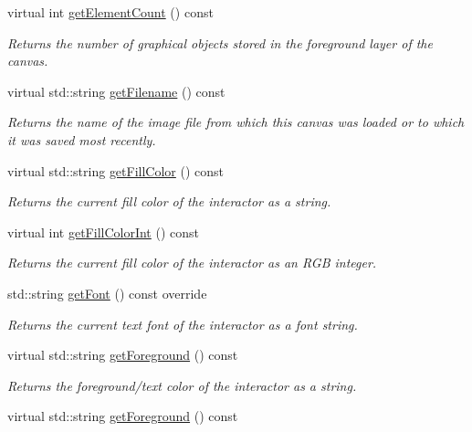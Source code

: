 \begin{DoxyCompactItemize}
virtual int \mbox{\hyperlink{classGCanvas_adf7d37ec315f859648def92e6b32408f}{get\+Element\+Count}} () const
\begin{DoxyCompactList}\small\item\em Returns the number of graphical objects stored in the foreground layer of the canvas. \end{DoxyCompactList}\item 
virtual std\+::string \mbox{\hyperlink{classGCanvas_a2011812670c3de9747702e3c052b6bb3}{get\+Filename}} () const
\begin{DoxyCompactList}\small\item\em Returns the name of the image file from which this canvas was loaded or to which it was saved most recently. \end{DoxyCompactList}\item 
virtual std\+::string \mbox{\hyperlink{classGDrawingSurface_a76f6964a11fde7c78e9751be184e1a3c}{get\+Fill\+Color}} () const
\begin{DoxyCompactList}\small\item\em Returns the current fill color of the interactor as a string. \end{DoxyCompactList}\item 
virtual int \mbox{\hyperlink{classGDrawingSurface_a88f4508d9271c4b5f5b5d6b780f223d0}{get\+Fill\+Color\+Int}} () const
\begin{DoxyCompactList}\small\item\em Returns the current fill color of the interactor as an R\+GB integer. \end{DoxyCompactList}\item 
std\+::string \mbox{\hyperlink{classGCanvas_aa0829769ac6325b5c58d27c8e363cb78}{get\+Font}} () const override
\begin{DoxyCompactList}\small\item\em Returns the current text font of the interactor as a font string. \end{DoxyCompactList}\item 
virtual std\+::string \mbox{\hyperlink{classGInteractor_a4fa2d8b0192a3a5b4af4bbfe71194d03}{get\+Foreground}} () const
\begin{DoxyCompactList}\small\item\em Returns the foreground/text color of the interactor as a string. \end{DoxyCompactList}\item 
virtual std\+::string \mbox{\hyperlink{classGDrawingSurface_a4fa2d8b0192a3a5b4af4bbfe71194d03}{get\+Foreground}} () const

\end{DoxyCompactItemize}
